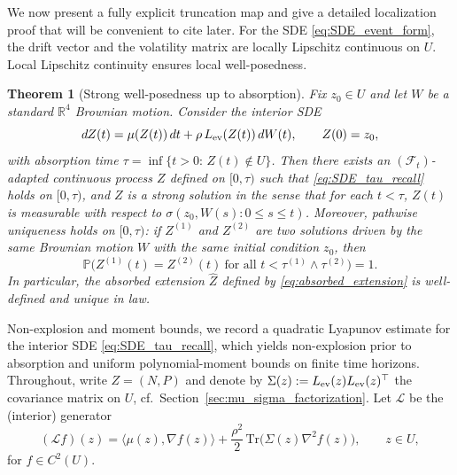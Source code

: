 \documentclass[pdflatex,sn-mathphys-ay]{sn-jnl}
\theoremstyle{thmstyleone}
\newtheorem{theorem}{Theorem}[section]
\theoremstyle{definition}
\theoremstyle{remark}
\begin{document}
We now present a fully explicit truncation map and give a detailed localization proof that will be convenient
to cite later.
For the SDE \eqref{eq:SDE_event_form}, the drift vector and the volatility matrix are locally Lipschitz continuous on $U$. Local Lipschitz continuity ensures local well-posedness.
\begin{theorem}[Strong well-posedness up to absorption]\citep{karatzas_brownian_1998}\label{thm:strong_wellposedness_tau}
Fix $z_0\in U$ and let $W$ be a standard $\mathbb{R}^4$ Brownian motion.
Consider the interior SDE
\begin{equation}\label{eq:SDE_tau_recall}
dZ(t)=\mu(Z(t))\,dt+\rho\,L_{\rm ev}(Z(t))\,dW(t),\qquad Z(0)=z_0,
\end{equation}
with absorption time $\tau=\inf\{t>0:\,Z(t)\notin U\}$.
Then there exists an $(\mathcal{F}_t)$-adapted continuous process $Z$ defined on $[0,\tau)$ such that
\eqref{eq:SDE_tau_recall} holds on $[0,\tau)$, and $Z$ is a strong solution in the sense that for each $t<\tau$,
$Z(t)$ is measurable with respect to $\sigma(z_0,W(s):0\le s\le t)$.
Moreover, pathwise uniqueness holds on $[0,\tau)$: if $Z^{(1)}$ and $Z^{(2)}$ are two solutions driven by the
same Brownian motion $W$ with the same initial condition $z_0$, then
\[
\mathbb{P}\bigl(Z^{(1)}(t)=Z^{(2)}(t)\ \text{for all } t<\tau^{(1)}\wedge \tau^{(2)}\bigr)=1.
\]
In particular, the absorbed extension $\widehat Z$ defined by \eqref{eq:absorbed_extension} is well-defined and
unique in law.
\end{theorem}

Non-explosion and moment bounds, we record a quadratic Lyapunov estimate for the interior SDE \eqref{eq:SDE_tau_recall}, which yields non-explosion prior to absorption and uniform polynomial-moment bounds on finite time horizons.
Throughout, write $Z=(N,P)$ and denote by $\Sigma(z):=L_{\rm ev}(z)L_{\rm ev}(z)^{\top}$ the covariance matrix on $U$,
cf.\ Section~\ref{sec:mu_sigma_factorization}. Let $\mathcal{L}$ be the (interior) generator
\begin{equation}\label{eq:generator_A}
(\mathcal{L}f)(z)=\langle \mu(z),\nabla f(z)\rangle+\frac{\rho^2}{2}\,\mathrm{Tr}\bigl(\Sigma(z)\nabla^2 f(z)\bigr),
\qquad z\in U,
\end{equation}
for $f\in C^2(U)$.
\end{document}
